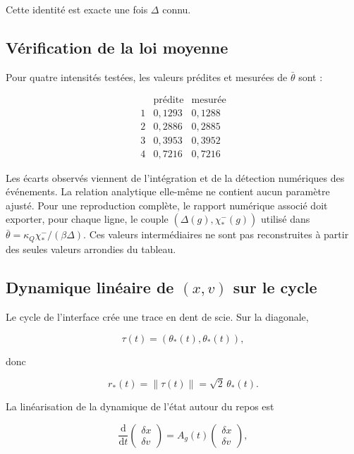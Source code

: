 Cette identité est exacte une fois \(\Delta\) connu.

\subsection{Vérification de la loi moyenne}
\label{annexe-r2-verification-moyenne}

Pour quatre intensités testées, les valeurs prédites et mesurées de
\(\bar\theta\) sont :

\[
\begin{array}{c|cc}
 & \text{prédite} & \text{mesurée}\\
\hline
1&0{,}1293&0{,}1288\\
2&0{,}2886&0{,}2885\\
3&0{,}3953&0{,}3952\\
4&0{,}7216&0{,}7216
\end{array}
\]

Les écarts observés viennent de l'intégration et de la détection
numériques des événements. La relation analytique elle-même ne
contient aucun paramètre ajusté. Pour une reproduction complète, le
rapport numérique associé doit exporter, pour chaque ligne, le couple
\((\Delta(g),\chi_\ast^-(g))\) utilisé dans
\(\bar\theta=\kappa_Q\chi_\ast^-/(\beta\Delta)\). Ces valeurs
intermédiaires ne sont pas reconstruites à partir des seules valeurs
arrondies du tableau.

\subsection{Dynamique linéaire de \texorpdfstring{$(x,v)$}{(x,v)} sur le cycle}
\label{annexe-r2-dynamique-lineaire}

Le cycle de l'interface crée une trace en dent de scie. Sur la
diagonale,

\[
\tau(t)
=
(\theta_\ast(t),\theta_\ast(t)),
\]

donc

\[
r_\ast(t)
=
\|\tau(t)\|
=
\sqrt2\,\theta_\ast(t).
\]

La linéarisation de la dynamique de l'état autour du repos est

\[
\frac{\mathrm d}{\mathrm dt}
\begin{pmatrix}
\delta x\\
\delta v
\end{pmatrix}
=
A_g(t)
\begin{pmatrix}
\delta x\\
\delta v
\end{pmatrix},
\]

